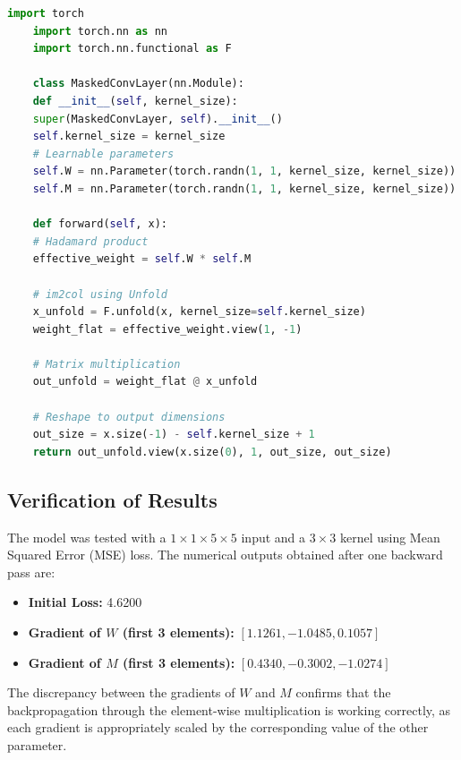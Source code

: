 \documentclass{article}
\begin{document}
\begin{tcolorbox}[colback=yellow!10!white, colframe=yellow!70!black, title=PyTorch Implementation, fonttitle=\bfseries]
	\begin{lstlisting}[language=Python, basicstyle=\small\ttfamily, breaklines=true]
	import torch
	import torch.nn as nn
	import torch.nn.functional as F
	
	class MaskedConvLayer(nn.Module):
	def __init__(self, kernel_size):
	super(MaskedConvLayer, self).__init__()
	self.kernel_size = kernel_size
	# Learnable parameters
	self.W = nn.Parameter(torch.randn(1, 1, kernel_size, kernel_size))
	self.M = nn.Parameter(torch.randn(1, 1, kernel_size, kernel_size))
	
	def forward(self, x):
	# Hadamard product
	effective_weight = self.W * self.M
	
	# im2col using Unfold
	x_unfold = F.unfold(x, kernel_size=self.kernel_size)
	weight_flat = effective_weight.view(1, -1)
	
	# Matrix multiplication
	out_unfold = weight_flat @ x_unfold
	
	# Reshape to output dimensions
	out_size = x.size(-1) - self.kernel_size + 1
	return out_unfold.view(x.size(0), 1, out_size, out_size)
	\end{lstlisting}
\end{tcolorbox}

\subsection{Verification of Results}
The model was tested with a $1 \times 1 \times 5 \times 5$ input and a $3 \times 3$ kernel using Mean Squared Error (MSE) loss. The numerical outputs obtained after one backward pass are:

\begin{itemize}
	\item \textbf{Initial Loss:} 4.6200
	\item \textbf{Gradient of $W$ (first 3 elements):} $[ 1.1261, -1.0485, 0.1057 ]$
	\item \textbf{Gradient of $M$ (first 3 elements):} $[ 0.4340, -0.3002, -1.0274 ]$
\end{itemize}

The discrepancy between the gradients of $W$ and $M$ confirms that the backpropagation through the element-wise multiplication is working correctly, as each gradient is appropriately scaled by the corresponding value of the other parameter.
\end{document}
